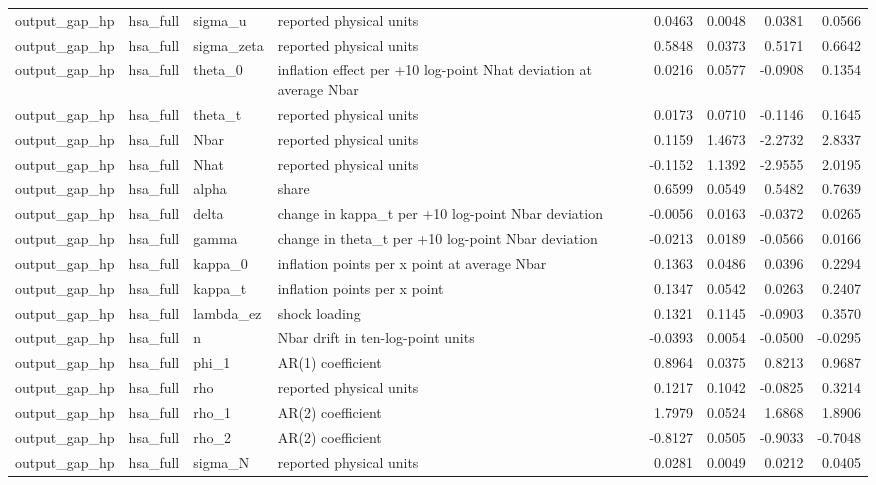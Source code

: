 \begin{tabular}{llllrrrr}
output\_gap\_hp & hsa\_full & sigma\_u & reported physical units & 0.0463 & 0.0048 & 0.0381 & 0.0566 \\
output\_gap\_hp & hsa\_full & sigma\_zeta & reported physical units & 0.5848 & 0.0373 & 0.5171 & 0.6642 \\
output\_gap\_hp & hsa\_full & theta\_0 & inflation effect per +10 log-point Nhat deviation at average Nbar & 0.0216 & 0.0577 & -0.0908 & 0.1354 \\
output\_gap\_hp & hsa\_full & theta\_t & reported physical units & 0.0173 & 0.0710 & -0.1146 & 0.1645 \\
output\_gap\_hp & hsa\_full & Nbar & reported physical units & 0.1159 & 1.4673 & -2.2732 & 2.8337 \\
output\_gap\_hp & hsa\_full & Nhat & reported physical units & -0.1152 & 1.1392 & -2.9555 & 2.0195 \\
output\_gap\_hp & hsa\_full & alpha & share & 0.6599 & 0.0549 & 0.5482 & 0.7639 \\
output\_gap\_hp & hsa\_full & delta & change in kappa\_t per +10 log-point Nbar deviation & -0.0056 & 0.0163 & -0.0372 & 0.0265 \\
output\_gap\_hp & hsa\_full & gamma & change in theta\_t per +10 log-point Nbar deviation & -0.0213 & 0.0189 & -0.0566 & 0.0166 \\
output\_gap\_hp & hsa\_full & kappa\_0 & inflation points per x point at average Nbar & 0.1363 & 0.0486 & 0.0396 & 0.2294 \\
output\_gap\_hp & hsa\_full & kappa\_t & inflation points per x point & 0.1347 & 0.0542 & 0.0263 & 0.2407 \\
output\_gap\_hp & hsa\_full & lambda\_ez & shock loading & 0.1321 & 0.1145 & -0.0903 & 0.3570 \\
output\_gap\_hp & hsa\_full & n & Nbar drift in ten-log-point units & -0.0393 & 0.0054 & -0.0500 & -0.0295 \\
output\_gap\_hp & hsa\_full & phi\_1 & AR(1) coefficient & 0.8964 & 0.0375 & 0.8213 & 0.9687 \\
output\_gap\_hp & hsa\_full & rho & reported physical units & 0.1217 & 0.1042 & -0.0825 & 0.3214 \\
output\_gap\_hp & hsa\_full & rho\_1 & AR(2) coefficient & 1.7979 & 0.0524 & 1.6868 & 1.8906 \\
output\_gap\_hp & hsa\_full & rho\_2 & AR(2) coefficient & -0.8127 & 0.0505 & -0.9033 & -0.7048 \\
output\_gap\_hp & hsa\_full & sigma\_N & reported physical units & 0.0281 & 0.0049 & 0.0212 & 0.0405 \\

\end{tabular}

